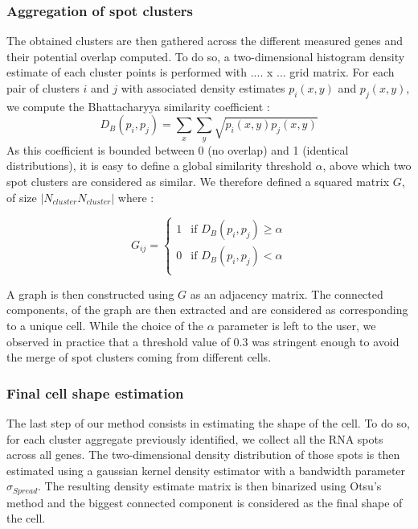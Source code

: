 \documentclass[12pt]{article}
\begin{document}
\subsubsection{Aggregation of spot clusters}

The obtained clusters are then gathered across the different measured genes and their potential overlap computed. To do so, a two-dimensional histogram density estimate of each cluster points is performed with .... x ... grid matrix. For each pair of clusters $i$ and $j$ with associated density estimates $p_{i}(x,y)$ and $p_{j}(x,y)$, we compute the Bhattacharyya similarity coefficient :
\begin{equation}
D_{B}(p_{i},p_{j}) = \sum_{x} \sum_{y} \sqrt{p_{i}(x,y)p_{j}(x,y)}
\end{equation}
As this coefficient is bounded between 0 (no overlap) and 1 (identical distributions), it is easy to define a global similarity threshold $\alpha$, above which two spot clusters are considered as similar. We therefore defined a squared matrix $G$, of size $|N_{cluster}N_{cluster}|$ where :

		\begin{equation}
		G_{ij} = 
		\begin{cases}
		1 & \text{if $D_{B}(p_{i},p_{j}) \geq \alpha$}\\
		0 & \text{if $D_{B}(p_{i},p_{j}) < \alpha$}\\		
		\end{cases}
		\end{equation}

A graph is then constructed using $G$ as an adjacency matrix. The connected components,  of the graph are then extracted and are considered as corresponding to a unique cell.
While the choice of the $\alpha$ parameter is left to the user, we observed in practice that a threshold value of 0.3 was stringent enough to avoid the merge of spot clusters coming from different cells.

\subsubsection{Final cell shape estimation}

The last step of our method consists in estimating the shape of the cell. To do so, for each cluster aggregate previously identified, we collect all the RNA spots across all genes. The two-dimensional density distribution of those spots is then estimated using a gaussian kernel density estimator with a bandwidth parameter $\sigma_{Spread}$. The resulting density estimate matrix is then binarized using Otsu's method and the biggest connected component is considered as the final shape of the cell.
\end{document}
